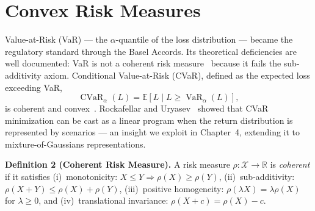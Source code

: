 \section{Convex Risk Measures}

Value-at-Risk (VaR) --- the $\alpha$-quantile of the loss distribution --- became the regulatory standard through the Basel Accords. Its theoretical deficiencies are well documented: VaR is not a coherent risk measure~\cite{artzner1999} because it fails the sub-additivity axiom. Conditional Value-at-Risk (CVaR), defined as the expected loss exceeding VaR,
\begin{equation}
\operatorname{CVaR}_\alpha(L) = \mathbb{E}\!\left[L \mid L \geq \operatorname{VaR}_\alpha(L)\right],
\label{eq:cvar}
\end{equation}
is coherent and convex~\cite{rockafellar2000}. Rockafellar and Uryasev~\cite{rockafellar2002} showed that CVaR minimization can be cast as a linear program when the return distribution is represented by scenarios --- an insight we exploit in Chapter~4, extending it to mixture-of-Gaussians representations.

\begin{definitionbox}
\textbf{Definition 2 (Coherent Risk Measure).} A risk measure $\rho: \mathcal{X} \to \mathbb{R}$ is \textit{coherent} if it satisfies (i)~monotonicity: $X \leq Y \Rightarrow \rho(X) \geq \rho(Y)$, (ii)~sub-additivity: $\rho(X+Y) \leq \rho(X) + \rho(Y)$, (iii)~positive homogeneity: $\rho(\lambda X) = \lambda\rho(X)$ for $\lambda \geq 0$, and (iv)~translational invariance: $\rho(X + c) = \rho(X) - c$.
\end{definitionbox}

